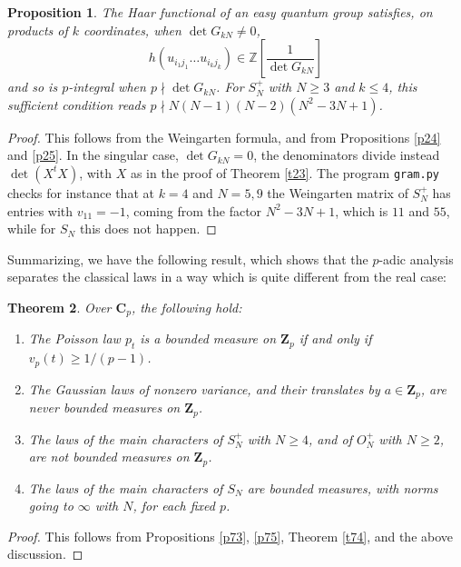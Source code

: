 \documentclass[11pt]{amsart}
\newtheorem{theorem}{Theorem}[section]
\newtheorem{proposition}[theorem]{Proposition}
\theoremstyle{definition}
\begin{document}
\begin{proposition}
\label{p76}
The Haar functional of an easy quantum group satisfies, on products of $k$ coordinates, when $\det G_{kN}\neq0$,
$$h(u_{i_1j_1}\ldots u_{i_kj_k})\in\mathbb Z\left[\frac{1}{\det G_{kN}}\right]$$
and so is $p$-integral when $p\nmid\det G_{kN}$. For $S_N^+$ with $N\geq3$ and $k\leq4$, this sufficient condition reads $p\nmid N(N-1)(N-2)(N^2-3N+1)$.
\end{proposition}

\begin{proof}
This follows from the Weingarten formula, and from Propositions \ref{p24} and \ref{p25}. In the singular case, $\det G_{kN}=0$, the denominators divide instead $\det(X^tX)$, with $X$ as in the proof of Theorem \ref{t23}. The program {\tt gram.py} checks for instance that at $k=4$ and $N=5,9$ the Weingarten matrix of $S_N^+$ has entries with $v_{11}=-1$, coming from the factor $N^2-3N+1$, which is $11$ and $55$, while for $S_N$ this does not happen.
\end{proof}

Summarizing, we have the following result, which shows that the $p$-adic analysis separates the classical laws in a way which is quite different from the real case:

\begin{theorem}
\label{t77}
Over $\mathbf C_p$, the following hold:
\begin{enumerate}
\item The Poisson law $p_t$ is a bounded measure on $\mathbf Z_p$ if and only if $v_p(t)\geq1/(p-1)$.

\item The Gaussian laws of nonzero variance, and their translates by $a\in\mathbf Z_p$, are never bounded measures on $\mathbf Z_p$.

\item The laws of the main characters of $S_N^+$ with $N\geq4$, and of $O_N^+$ with $N\geq2$, are not bounded measures on $\mathbf Z_p$.

\item The laws of the main characters of $S_N$ are bounded measures, with norms going to $\infty$ with $N$, for each fixed $p$.
\end{enumerate}
\end{theorem}

\begin{proof}
This follows from Propositions \ref{p73}, \ref{p75}, Theorem \ref{t74}, and the above discussion.
\end{proof}
\end{document}
